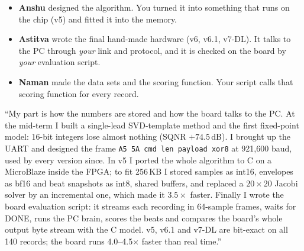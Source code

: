 \documentclass[11pt]{article}
\begin{document}
\begin{center}
\end{center}

\begin{itemize}
  \item \textbf{Anshu} designed the algorithm. You turned it into something that runs on the chip (v5) and fitted it into the memory.
  \item \textbf{Astitva} wrote the final hand-made hardware (v6, v6.1, v7-DL). It talks to the PC through \emph{your} link and protocol, and it is checked on the board by \emph{your} evaluation script.
  \item \textbf{Naman} made the data sets and the scoring function. Your script calls that scoring function for every record.
\end{itemize}

\begin{keyfact}
``My part is how the numbers are stored and how the board talks to the PC. At the mid-term I built a single-lead SVD-template method and the first fixed-point model: 16-bit integers lose almost nothing (SQNR $+74.5$\,dB). I brought up the UART and designed the frame \texttt{A5 5A cmd len payload xor8} at 921,600 baud, used by every version since. In v5 I ported the whole algorithm to C on a MicroBlaze inside the FPGA; to fit 256\,KB I stored samples as int16, envelopes as bf16 and beat snapshots as int8, shared buffers, and replaced a $20\times20$ Jacobi solver by an incremental one, which made it $3.5\times$ faster. Finally I wrote the board evaluation script: it streams each recording in 64-sample frames, waits for DONE, runs the PC brain, scores the beats and compares the board's whole output byte stream with the C model. v5, v6.1 and v7-DL are bit-exact on all 140 records; the board runs 4.0--4.5$\times$ faster than real time.''
\end{keyfact}
\end{document}

